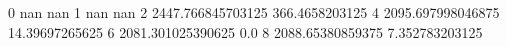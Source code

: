 0 nan nan
1 nan nan
2 2447.766845703125 366.4658203125
4 2095.697998046875 14.39697265625
6 2081.301025390625 0.0
8 2088.65380859375 7.352783203125
